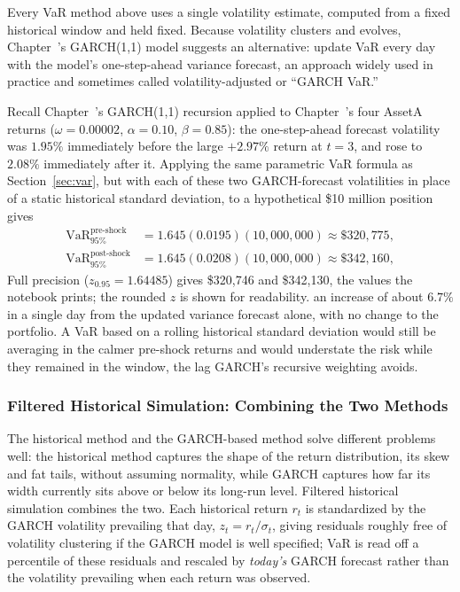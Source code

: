 \documentclass[../ai_in_finance]{subfiles}
\begin{document}
Every VaR method above uses a single volatility estimate, computed from a fixed historical window and held fixed. Because volatility clusters and evolves, Chapter~'s GARCH(1,1) model suggests an alternative: update VaR every day with the model's one-step-ahead variance forecast, an approach widely used in practice and sometimes called volatility-adjusted or ``GARCH VaR.''

Recall Chapter~'s GARCH(1,1) recursion applied to Chapter~'s four AssetA returns ($\omega=0.00002$, $\alpha=0.10$, $\beta=0.85$): the one-step-ahead forecast volatility was $1.95\%$ immediately before the large $+2.97\%$ return at $t=3$, and rose to $2.08\%$ immediately after it. Applying the same parametric VaR formula as Section~\ref{sec:var}, but with each of these two GARCH-forecast volatilities in place of a static historical standard deviation, to a hypothetical \$10 million position gives
\begin{align*}
\text{VaR}_{95\%}^{\text{pre-shock}} &= 1.645(0.0195)(10{,}000{,}000) \approx \$320{,}775, \\
\text{VaR}_{95\%}^{\text{post-shock}} &= 1.645(0.0208)(10{,}000{,}000) \approx \$342{,}160,
\end{align*}
Full precision ($z_{0.95}=1.64485$) gives \$320{,}746 and \$342{,}130, the values the notebook prints; the rounded $z$ is shown for readability.
an increase of about $6.7\%$ in a single day from the updated variance forecast alone, with no change to the portfolio. A VaR based on a rolling historical standard deviation would still be averaging in the calmer pre-shock returns and would understate the risk while they remained in the window, the lag GARCH's recursive weighting avoids.

\subsubsection*{Filtered Historical Simulation: Combining the Two Methods}

The historical method and the GARCH-based method solve different problems well: the historical method captures the shape of the return distribution, its skew and fat tails, without assuming normality, while GARCH captures how far its width currently sits above or below its long-run level.
Filtered historical simulation combines the two. Each historical return $r_t$ is standardized by the GARCH volatility prevailing that day, $z_t = r_t/\sigma_t$, giving residuals roughly free of volatility clustering if the GARCH model is well specified; VaR is read off a percentile of these residuals and rescaled by \emph{today's} GARCH forecast rather than the volatility prevailing when each return was observed.
\end{document}
